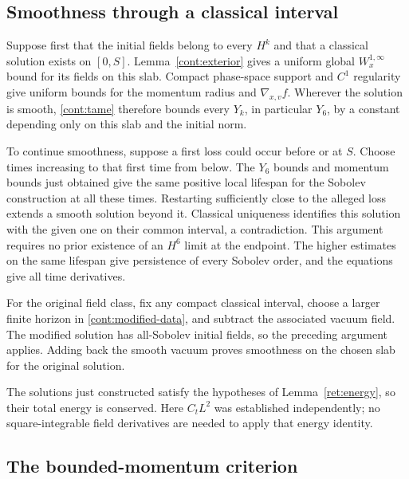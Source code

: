 \subsection{Smoothness through a classical interval}
\label{cont:persistence}

Suppose first that the initial fields belong to every $H^k$ and that
a classical solution exists on $[0,S]$.
Lemma~\ref{cont:exterior} gives a uniform global
$W^{1,\infty}_x$ bound for its fields on this slab.
Compact phase-space support and $C^1$ regularity give uniform bounds
for the momentum radius and $\nabla_{x,v}f$.
Wherever the solution is smooth, \eqref{cont:tame} therefore bounds
every $Y_k$, in particular $Y_6$, by a constant depending only on this
slab and the initial norm.

To continue smoothness, suppose a first loss could occur before or at
$S$.  Choose times increasing to that first time from below.
The $Y_6$ bounds and momentum bounds just obtained give the same
positive local lifespan for the Sobolev construction at all these
times.  Restarting sufficiently close to the alleged loss extends a
smooth solution beyond it.  Classical uniqueness identifies this
solution with the given one on their common interval, a contradiction.
This argument requires no prior existence of an $H^6$ limit at the
endpoint.  The higher estimates on the same lifespan give persistence
of every Sobolev order, and the equations give all time derivatives.

For the original field class, fix any compact classical interval,
choose a larger finite horizon in \eqref{cont:modified-data}, and
subtract the associated vacuum field.  The modified solution has
all-Sobolev initial fields, so the preceding argument applies.
Adding back the smooth vacuum proves smoothness on the chosen slab
for the original solution.

The solutions just constructed satisfy the hypotheses of
Lemma~\ref{ret:energy}, so their total energy is conserved.
Here $C_tL^2$ was established independently; no square-integrable
field derivatives are needed to apply that energy identity.

\subsection{The bounded-momentum criterion}
\label{cont:continuation}

